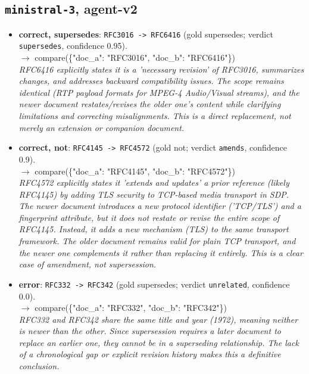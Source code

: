 \subsection*{\texttt{ministral-3}, agent-v2}
\begin{itemize}
\item \textbf{correct, supersedes}: \texttt{RFC3016 -> RFC6416} (gold supersedes; verdict \texttt{supersedes}, confidence 0.95).\\ {\small\ttfamily $\rightarrow$ compare(\{"doc\_a": "RFC3016", "doc\_b": "RFC6416"\})}\\ \emph{RFC6416 explicitly states it is a 'necessary revision' of RFC3016, summarizes changes, and addresses backward compatibility issues. The scope remains identical (RTP payload formats for MPEG-4 Audio/Visual streams), and the newer document restates/revises the older one's content while clarifying limitations and correcting misalignments. This is a direct replacement, not merely an extension or companion document.}
\item \textbf{correct, not}: \texttt{RFC4145 -> RFC4572} (gold not; verdict \texttt{amends}, confidence 0.9).\\ {\small\ttfamily $\rightarrow$ compare(\{"doc\_a": "RFC4145", "doc\_b": "RFC4572"\})}\\ \emph{RFC4572 explicitly states it 'extends and updates' a prior reference (likely RFC4145) by adding TLS security to TCP-based media transport in SDP. The newer document introduces a new protocol identifier ('TCP/TLS') and a fingerprint attribute, but it does not restate or revise the entire scope of RFC4145. Instead, it adds a new mechanism (TLS) to the same transport framework. The older document remains valid for plain TCP transport, and the newer one complements it rather than replacing it entirely. This is a clear case of amendment, not supersession.}
\item \textbf{error}: \texttt{RFC332 -> RFC342} (gold supersedes; verdict \texttt{unrelated}, confidence 0.0).\\ {\small\ttfamily $\rightarrow$ compare(\{"doc\_a": "RFC332", "doc\_b": "RFC342"\})}\\ \emph{RFC332 and RFC342 share the same title and year (1972), meaning neither is newer than the other. Since supersession requires a later document to replace an earlier one, they cannot be in a superseding relationship. The lack of a chronological gap or explicit revision history makes this a definitive conclusion.}
\end{itemize}
